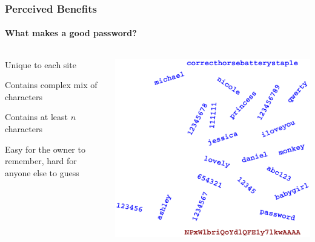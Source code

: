 \documentclass[handout, notes=hide]{beamer}
\begin{document}
\begin{frame}
\frametitle{Perceived Benefits}
\framesubtitle{What makes a good password?}
\setlength{\parskip}{0.5em}

\vspace{+2.0em}

\begin{columns}[T]
\begin{column}[T]{0.6\textwidth}
\setlength{\parskip}{0.5em}

Unique to each site

Contains complex mix of characters

Contains at least $n$ characters

Easy for the owner to remember, hard for anyone else to guess

\end{column}
\begin{column}[T]{0.4\textwidth}
\vspace{-3.0em}
\hspace{-7.0em}
\includegraphics[width=1.6\textwidth]{rockyou}
\end{column}
\end{columns}

\end{frame}
\end{document}
